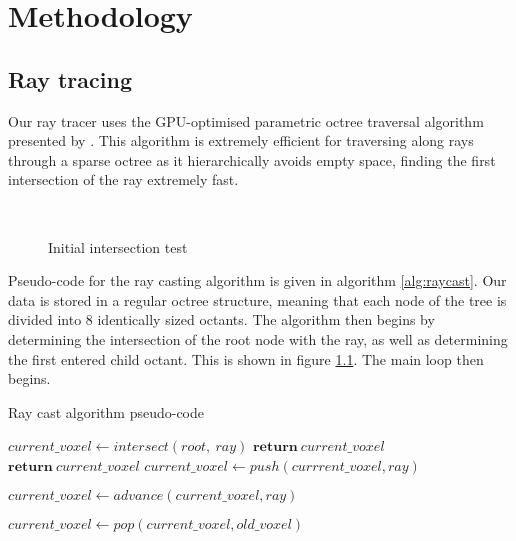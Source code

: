 \chapter{Methodology}
\label{methodology}

\section{Ray tracing}
Our ray tracer uses the GPU-optimised parametric octree traversal algorithm presented by \cite{laine10efficientsvos}. This algorithm is extremely efficient for traversing along rays through a sparse octree as it hierarchically avoids empty space, finding the first intersection of the ray extremely fast.

\begin{figure}
\centering
	\centering
	~

	\caption{Initial intersection test}
	\label{fig:root_intersect}
\end{figure}

Pseudo-code for the ray casting algorithm is given in algorithm \ref{alg:raycast}. Our data is stored in a regular octree structure, meaning that each node of the tree is divided into 8 identically sized octants. The algorithm then begins by determining the intersection of the root node with the ray, as well as determining the first entered child octant. This is shown in figure \ref{fig:root_intersect}. The main loop then begins.

\begin{algorithm}
\caption{Ray cast algorithm pseudo-code \parencite{laine10efficientsvos}}
\label{alg:raycast}
\begin{algorithmic}[1]
	\State $current\_voxel \gets intersect(root,~ray)$			
	 
			 					
				\State $\textbf{return}~current\_voxel$
				\State $\textbf{return}~current\_voxel$
			\Else
				\State $current\_voxel \gets push(currrent\_voxel, ray)$		
			\EndIf
		\EndIf

		\State $current\_voxel \gets advance(current\_voxel, ray)$			

			\State $current\_voxel \gets pop(current\_voxel, old\_voxel)$			
		\EndIf
	\EndWhile
\EndProcedure
\end{algorithmic}
\end{algorithm}

